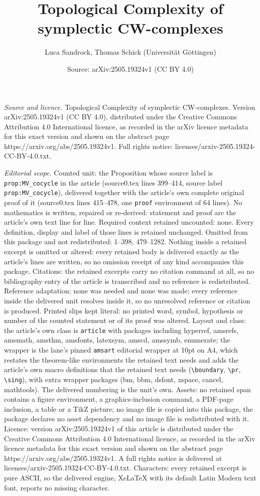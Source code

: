 \documentclass[10pt,a4paper]{amsart}
\title[Topological Complexity of symplectic CW-complexes]{Topological Complexity of symplectic CW-complexes}
\author{Luca Sandrock, Thomas Schick (Universit\"at G\"ottingen)}
\date{Source: arXiv:2505.19324v1 (CC BY 4.0)}
\begin{document}
\maketitle

\noindent\emph{Source and licence.} Topological Complexity of symplectic CW-complexes. Version arXiv:2505.19324v1 (CC BY 4.0), distributed under the Creative Commons Attribution 4.0 International licence, as recorded in the arXiv licence metadata for this exact version and shown on the abstract page https://arxiv.org/abs/2505.19324v1. Full rights notice: licenses/arxiv-2505.19324-CC-BY-4.0.txt.\par\smallskip

\noindent\textit{Editorial scope.} Counted unit: the Proposition whose source label is \texttt{prop:MV\_cocycle} in the article (source0.tex lines 399--414, source label \texttt{prop:MV\_cocycle}), delivered together with the article's own complete original proof of it (source0.tex lines 415--478, one \texttt{proof} environment of 64 lines). No mathematics is written, repaired or re-derived: statement and proof are the article's own text line for line. Required context retained uncounted: none. Every definition, display and label of those lines is retained unchanged. Omitted from this package and not redistributed: 1--398, 479--1282. Nothing inside a retained excerpt is omitted or altered: every retained body is delivered exactly as the article's lines are written, so no omission receipt of any kind accompanies this package. Citations: the retained excerpts carry no citation command at all, so no bibliography entry of the article is transcribed and no reference is redistributed. Reference adaptation: none was needed and none was made; every reference inside the delivered unit resolves inside it, so no unresolved reference or citation is produced. Printed slips kept literal: no printed word, symbol, hypothesis or number of the counted statement or of its proof was altered. Layout and class: the article's own class is \texttt{article} with packages including hyperref, amsrefs, amsmath, amsthm, amsfonts, latexsym, amscd, amssymb, enumerate; the wrapper is the lane's pinned \texttt{amsart} editorial wrapper at 10pt on A4, which restates the theorem-like environments the retained text needs and adds the article's own macro definitions that the retained text needs (\texttt{\textbackslash boundary}, \texttt{\textbackslash pr}, \texttt{\textbackslash sing}), with extra wrapper packages (bm, bbm, dsfont, xspace, cancel, mathtools). The delivered numbering is the unit's own. Assets: no retained span contains a figure environment, a graphics-inclusion command, a PDF-page inclusion, a table or a TikZ picture; no image file is copied into this package, the package declares no asset dependency and no image file is redistributed with it. Licence: version arXiv:2505.19324v1 of this article is distributed under the Creative Commons Attribution 4.0 International licence, as recorded in the arXiv licence metadata for this exact version and shown on the abstract page https://arxiv.org/abs/2505.19324v1. A full rights notice is delivered at licenses/arxiv-2505.19324-CC-BY-4.0.txt. Characters: every retained excerpt is pure ASCII, so the delivered engine, XeLaTeX with its default Latin Modern text font, reports no missing character.
\end{document}
